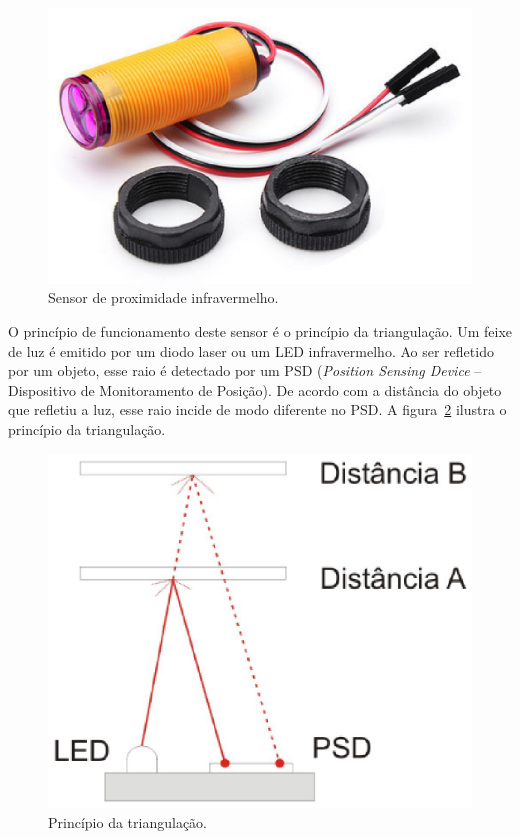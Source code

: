   \begin{figure}[!htbp]
  \begin{center}
  \includegraphics[width=.7\textwidth]{figuras/infrared.eps}
  \caption{\label{fig:infrared}Sensor de proximidade infravermelho.}
  \end{center}
  \end{figure}

  O princípio de funcionamento deste sensor é o princípio da triangulação.
  Um feixe de luz é emitido por um diodo laser ou um LED infravermelho.
  Ao ser refletido por um objeto, esse raio é detectado por um PSD
  (\textit{Position Sensing Device} -- Dispositivo de Monitoramento de Posição).
  De acordo com a distância do objeto que refletiu a luz, esse raio incide
  de modo diferente no PSD. A figura~\ref{fig:infrared_func} ilustra o
  princípio da triangulação.

  \begin{figure}[!htbp]
  \begin{center}
  \includegraphics[width=.7\textwidth]{figuras/infrared_func.eps}
  \caption{\label{fig:infrared_func}Princípio da triangulação.}
  \end{center}
  \end{figure}

